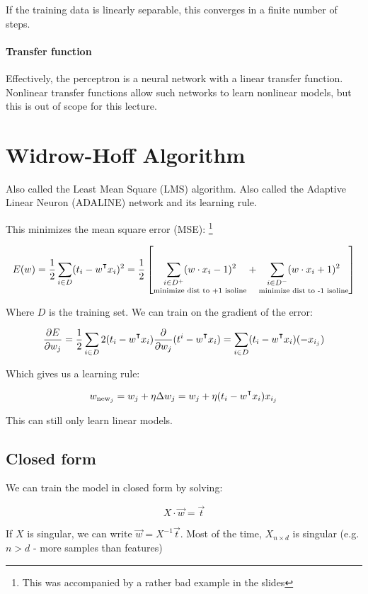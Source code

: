 \documentclass{idc_msc}
\renewcommand{\T}{{\mathpalette\raiseT\intercal}} %
\begin{document}
If the training data is linearly separable, this converges in a finite number of steps.

\paragraph{Transfer function}

Effectively, the perceptron is a neural network with a linear transfer function.
Nonlinear transfer functions allow such networks to learn nonlinear models, but this is out of scope for this lecture.


\clearpage
\section{Widrow-Hoff Algorithm}

Also called the Least Mean Square (LMS) algorithm.
Also called the Adaptive Linear Neuron (ADALINE) network and its learning rule.

This minimizes the mean square error (MSE):
\footnote{This was accompanied by a rather bad example in the slides}

\[E(w) = \frac{1}{2}\sum_{i \in D}(t_i - w^\T x_i)^2 = \frac{1}{2}\left[ \underset{\text{minimize dist to +1 isoline}}{\sum_{i\in D^+} (w \cdot x_i - 1)^2} + \underset{\text{minimize dist to -1 isoline}}{\sum_{i \in D^-}(w \cdot x_i + 1)^2} \right]\]

Where \(D\) is the training set.
We can train on the gradient of the error:

\[\frac{\partial E}{\partial w_j} = \frac{1}{2}\sum_{i \in D}2 (t_i - w^\T x_i) \frac{\partial}{\partial w_j} (t^i - w^\T x_i) =\sum_{i \in D}(t_i - w^\T x_i)(- x_{i_j}) \]

Which gives us a learning rule:

\[w_{\text{new}_j} = w_j + \eta \Delta w_j = w_j + \eta(t_i - w^\T x_i) x_{i_j}\]

This can still only learn linear models.

\subsection{Closed form}

We can train the model in closed form by solving:

\[X \cdot \vec{w} = \vec{t}\]

If \(X\) is singular, we can write \(\vec{w} = X^{-1} \vec{t}\).
Most of the time, \(X_{n \times d}\) is singular (e.g. \(n > d\) - more samples than features)
\end{document}
